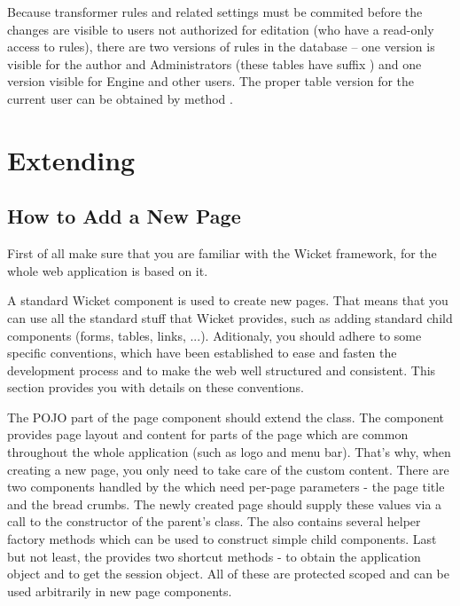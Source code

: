 \begin{description}[style=nextline,font=\ttfamily]
Because transformer rules and related settings must be commited before the changes are visible to  users not 
authorized for editation (who have a read-only access to rules), there are two versions of rules in the database -- one version is visible for the author and Administrators (these tables have suffix ) and one version visible for Engine and other users. The proper table version for the current user can be obtained by method .

\code{}

\section{Extending}

\subsection{How to Add a New Page}
\label{sec:howToAddANewPage}

First of all make sure that you are familiar with the Wicket framework, for the whole web application is based on it.

A standard Wicket  component is used to create new pages. That means that you can use all the standard stuff that Wicket provides, such as adding standard child components (forms, tables, links, ...). Aditionaly, you should adhere to some specific conventions, which have been established to ease and fasten the development process and to make the web well structured and consistent. This section provides you with details on these conventions.

The POJO part of the page component should extend the  class. The  component provides page layout and content for parts of the page which are common throughout the whole application (such as logo and menu bar). That's why, when creating a new page, you only need to take care of the custom content. There are two components handled by the  which need per-page parameters - the page title and the bread crumbs. The newly created page should supply these values via a call to the constructor of the parent's class. The  also contains several helper factory methods which can be used to construct simple child components. Last but not least, the  provides two shortcut methods -  to obtain the application object and  to get the session object. All of these are protected scoped and can be used arbitrarily in new page components.


\end{description}
